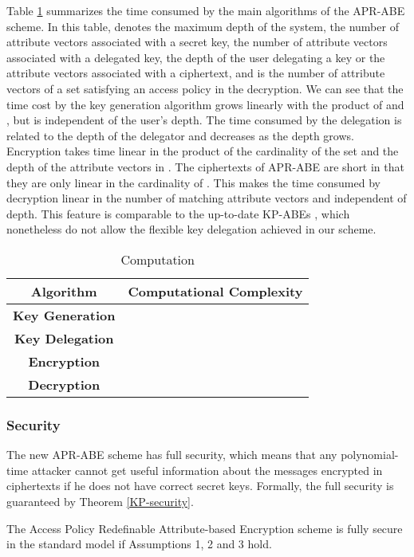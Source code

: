 \documentclass[twocolumn]{svjour3}          \smartqed  \usepackage{graphicx}
\begin{document}
Table \ref{com-complexity} summarizes the time consumed by the main algorithms of the APR-ABE scheme. In this table,  denotes the maximum depth of the system,  the number of attribute vectors associated with a secret key,  the number of attribute vectors associated with a delegated key,  the depth of the user delegating a key or the attribute vectors associated with a ciphertext, and  is the number of attribute vectors of a set satisfying an access policy in the decryption. We can see that the time cost by the key generation algorithm grows linearly with the product of  and , but is independent of the user's depth. The time consumed by the delegation is related to the depth of the delegator and decreases as the depth grows. Encryption takes time linear in the product of the cardinality of the set  and the depth of the attribute vectors in . The ciphertexts of APR-ABE are short in that they are only linear in the cardinality of . This makes the time consumed by decryption linear in the number of matching attribute vectors and independent of depth. This feature 
is comparable to the up-to-date KP-ABEs \cite{GPS+06,LOS+10,HW13}, which nonetheless do not allow the flexible key delegation achieved in our scheme.


\begin{table}[!t]
\renewcommand{\arraystretch}{1.5}
\caption{Computation}
\label{com-complexity}
\centering
\begin{tabular}{|c|c|}
\hline Algorithm & Computational Complexity \\
\hline
\bfseries Key Generation & \\
\hline
\bfseries Key Delegation & \\
\hline
\bfseries Encryption &  \\
\hline
\bfseries Decryption &  \\
\hline
\end{tabular}
\end{table}

\subsubsection{Security}
The new APR-ABE scheme has full security, which means that any polynomial-time attacker cannot get useful information about the messages encrypted in ciphertexts if he does not have correct secret keys. Formally, the full security is guaranteed by Theorem \ref{KP-security}.
\begin{theorem}\label{KP-security} The Access Policy 
Redefinable Attribute-based Encryption scheme is fully secure in the standard model if Assumptions 1, 2 and 3 hold.
\end{theorem}
\end{document}
